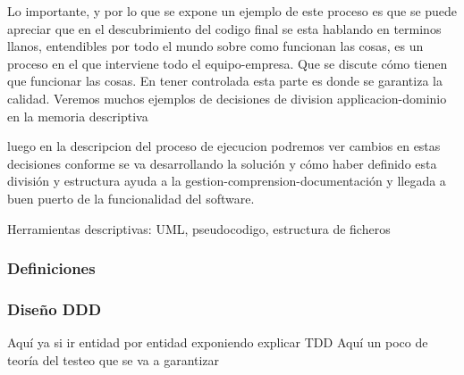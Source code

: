 Lo importante, y por lo que se expone un ejemplo de este proceso es que se puede apreciar que en el descubrimiento del codigo final se esta hablando en terminos llanos, entendibles por todo el mundo sobre como funcionan las cosas, es un proceso en el que interviene todo el equipo-empresa. Que se discute cómo tienen que funcionar las cosas. En tener controlada esta parte es donde se garantiza la calidad. Veremos muchos ejemplos de decisiones de division applicacion-dominio en la memoria descriptiva

luego en la descripcion del proceso de ejecucion podremos ver cambios en estas decisiones conforme se va desarrollando la solución y cómo haber definido esta división y estructura ayuda a la gestion-comprension-documentación y llegada a buen puerto de la funcionalidad del software.




Herramientas descriptivas: UML, pseudocodigo, estructura de ficheros

\subsubsection{Definiciones}
    
\subsubsection{Diseño DDD}

Aquí ya si ir entidad por entidad exponiendo
explicar TDD Aquí un poco de teoría del testeo que se va a garantizar



